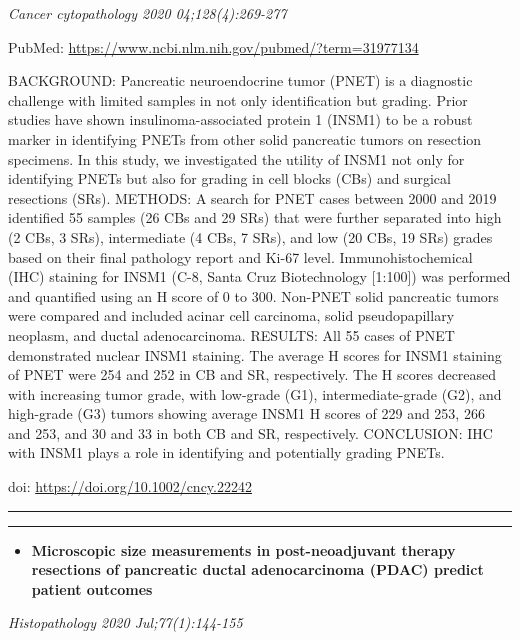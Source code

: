\documentclass[
]{article}
\providecommand{\tightlist}{%
  \setlength{\itemsep}{0pt}\setlength{\parskip}{0pt}}
\begin{document}
\emph{Cancer cytopathology 2020 04;128(4):269-277}

PubMed: \url{https://www.ncbi.nlm.nih.gov/pubmed/?term=31977134}

BACKGROUND: Pancreatic neuroendocrine tumor (PNET) is a diagnostic
challenge with limited samples in not only identification but grading.
Prior studies have shown insulinoma-associated protein 1 (INSM1) to be a
robust marker in identifying PNETs from other solid pancreatic tumors on
resection specimens. In this study, we investigated the utility of INSM1
not only for identifying PNETs but also for grading in cell blocks (CBs)
and surgical resections (SRs). METHODS: A search for PNET cases between
2000 and 2019 identified 55 samples (26 CBs and 29 SRs) that were
further separated into high (2 CBs, 3 SRs), intermediate (4 CBs, 7 SRs),
and low (20 CBs, 19 SRs) grades based on their final pathology report
and Ki-67 level. Immunohistochemical (IHC) staining for INSM1 (C-8,
Santa Cruz Biotechnology {[}1:100{]}) was performed and quantified using
an H score of 0 to 300. Non-PNET solid pancreatic tumors were compared
and included acinar cell carcinoma, solid pseudopapillary neoplasm, and
ductal adenocarcinoma. RESULTS: All 55 cases of PNET demonstrated
nuclear INSM1 staining. The average H scores for INSM1 staining of PNET
were 254 and 252 in CB and SR, respectively. The H scores decreased with
increasing tumor grade, with low-grade (G1), intermediate-grade (G2),
and high-grade (G3) tumors showing average INSM1 H scores of 229 and
253, 266 and 253, and 30 and 33 in both CB and SR, respectively.
CONCLUSION: IHC with INSM1 plays a role in identifying and potentially
grading PNETs.

doi: \url{https://doi.org/10.1002/cncy.22242}

\begin{center}\rule{0.5\linewidth}{0.5pt}\end{center}

\begin{center}\rule{0.5\linewidth}{0.5pt}\end{center}

\begin{itemize}
\tightlist
\item
  \textbf{Microscopic size measurements in post-neoadjuvant therapy
  resections of pancreatic ductal adenocarcinoma (PDAC) predict patient
  outcomes}
\end{itemize}

\emph{Histopathology 2020 Jul;77(1):144-155}
\end{document}
